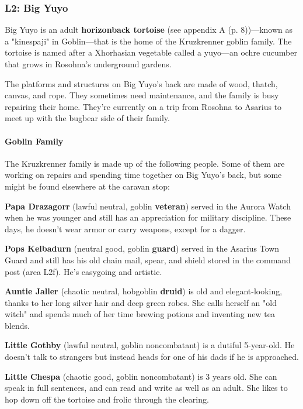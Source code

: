 \documentclass[letterpaper, 11pt, bg=full, twocolumn]{dndbook}
\begin{document}
\subsubsection{L2: Big Yuyo}

Big Yuyo is an adult \textbf{horizonback tortoise} (see appendix A (p. 8))---known as a "kinespaji" in Goblin---that is the home of the Kruzkrenner goblin family. The tortoise is named after a Xhorhasian vegetable called a yuyo---an ochre cucumber that grows in Rosohna's underground gardens.

The platforms and structures on Big Yuyo's back are made of wood, thatch, canvas, and rope. They sometimes need maintenance, and the family is busy repairing their home. They're currently on a trip from Rosohna to Asarius to meet up with the bugbear side of their family.

\paragraph{Goblin Family}

The Kruzkrenner family is made up of the following people. Some of them are working on repairs and spending time together on Big Yuyo's back, but some might be found elsewhere at the caravan stop:

\textbf{Papa Drazagorr} (lawful neutral, goblin \textbf{veteran}) served in the Aurora Watch when he was younger and still has an appreciation for military discipline. These days, he doesn't wear armor or carry weapons, except for a dagger.

\textbf{Pops Kelbadurn} (neutral good, goblin \textbf{guard}) served in the Asarius Town Guard and still has his old chain mail, spear, and shield stored in the command post (area L2f). He's easygoing and artistic.

\textbf{Auntie Jaller} (chaotic neutral, hobgoblin \textbf{druid}) is old and elegant-looking, thanks to her long silver hair and deep green robes. She calls herself an "old witch" and spends much of her time brewing potions and inventing new tea blends.

\textbf{Little Gothby} (lawful neutral, goblin noncombatant) is a dutiful 5-year-old. He doesn't talk to strangers but instead heads for one of his dads if he is approached.

\textbf{Little Chespa} (chaotic good, goblin noncombatant) is 3 years old. She can speak in full sentences, and can read and write as well as an adult. She likes to hop down off the tortoise and frolic through the clearing.
\end{document}
